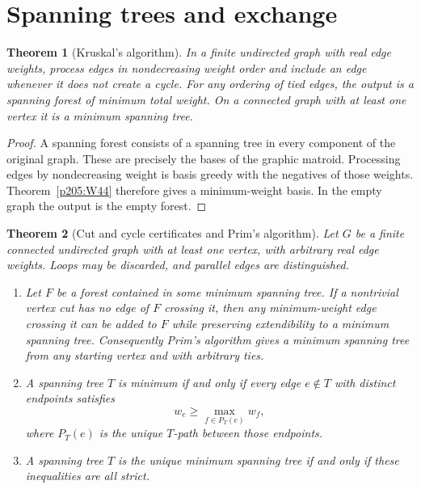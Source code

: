 \documentclass[11pt,oneside,openany]{book}
\theoremstyle{plain}
\newtheorem{theorem}{Theorem}[chapter]
\theoremstyle{definition}
\theoremstyle{remark}
\begin{document}
\section{Spanning trees and exchange}

\begin{theorem}[Kruskal's algorithm]
\label{p205:W47}
In a finite undirected graph with real edge weights, process
edges in nondecreasing weight order and include an edge whenever
it does not create a cycle. For any ordering of tied edges, the
output is a spanning forest of minimum total weight. On a connected
graph with at least one vertex it is a minimum spanning tree.
\end{theorem}

\begin{proof}
A spanning forest consists of a spanning tree in every component
of the original graph. These are precisely the bases of the graphic
matroid. Processing edges by nondecreasing weight is basis greedy
with the negatives of those weights. Theorem~\ref{p205:W44}
therefore gives a minimum-weight basis. In the empty graph the
output is the empty forest.
\end{proof}

\begin{theorem}[Cut and cycle certificates and Prim's algorithm]
\label{p205:W48}
Let \(G\) be a finite connected undirected graph with at least one
vertex, with arbitrary real edge weights. Loops may be discarded,
and parallel edges are distinguished.
\begin{enumerate}
\item Let \(F\) be a forest contained in some minimum spanning tree.
If a nontrivial vertex cut has no edge of \(F\) crossing it, then
any minimum-weight edge crossing it can be added to \(F\) while
preserving extendibility to a minimum spanning tree.
Consequently Prim's algorithm gives a minimum spanning tree from
any starting vertex and with arbitrary ties.
\item A spanning tree \(T\) is minimum if and only if every
edge \(e\notin T\) with distinct endpoints satisfies
\[
 w_e\ge\max_{f\in P_T(e)}w_f,
\]
where \(P_T(e)\) is the unique \(T\)-path between those endpoints.
\item A spanning tree \(T\) is the unique minimum spanning tree if
and only if these inequalities are all strict.
\end{enumerate}
\end{theorem}
\end{document}
